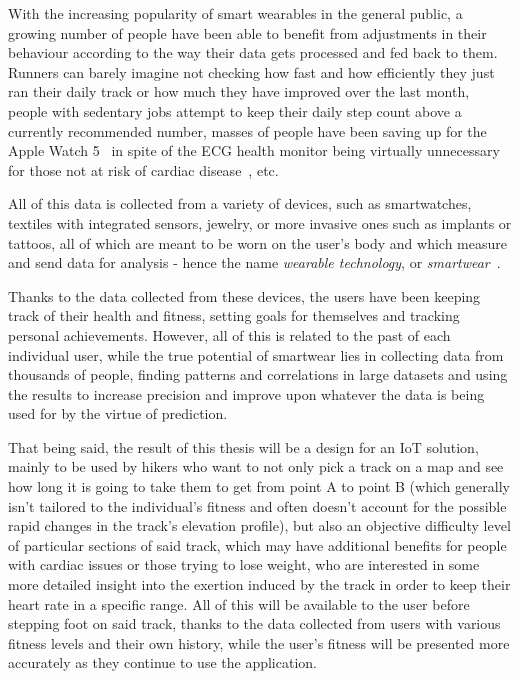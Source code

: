 With the increasing popularity of smart wearables in the general public, a growing number of people have been able to benefit from adjustments in their behaviour according to the way their data gets processed and fed back to them.
Runners can barely imagine not checking how fast and how efficiently they just ran their daily track or how much they have improved over the last month,
people with sedentary jobs attempt to keep their daily step count above a currently recommended number,
masses of people have been saving up for the Apple Watch 5~\cite{AppleWatch5} in spite of the ECG health monitor being virtually unnecessary for those not at risk of cardiac disease~\cite{ecg-screening}, etc.

All of this data is collected from a variety of devices, such as smartwatches, textiles with integrated sensors, jewelry, or more invasive ones such as implants or tattoos, all of which are meant to be worn on the user's body and which measure and send data for analysis - hence the name \textit{wearable technology}, or \textit{smartwear}~\cite{what-is-wearable-tech}.

Thanks to the data collected from these devices, the users have been keeping track of their health and fitness, setting goals for themselves and tracking personal achievements.
However, all of this is related to the past of each individual user, while the true potential of smartwear lies in collecting data from thousands of people,
finding patterns and correlations in large datasets and using the results to increase precision and improve upon whatever the data is being used for by the virtue of prediction.

That being said, the result of this thesis will be a design for an IoT solution, mainly to be used by hikers who want to not only pick a track on a map and see how long it is going to take them to get from point A to point B (which generally isn't tailored to the individual's fitness and often doesn't account for the possible rapid changes in the track's elevation profile),
but also an objective difficulty level of particular sections of said track, which may have additional benefits for people with cardiac issues or those trying to lose weight, who are interested in some more detailed insight into the exertion induced by the track in order to keep their heart rate in a specific range.
All of this will be available to the user before stepping foot on said track, thanks to the data collected from users with various fitness levels and their own history,
while the user's fitness will be presented more accurately as they continue to use the application.

